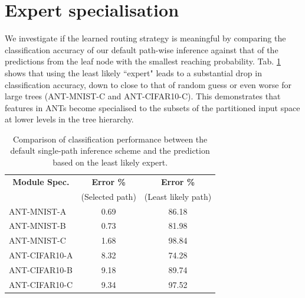 \section{Expert specialisation}\label{sec:supp_expert_specialisation}
\vspace{-2mm}
We investigate if the learned routing strategy is meaningful by comparing the classification accuracy of our default path-wise inference against that of the predictions from the leaf node with the smallest reaching probability. Tab. \ref{tab:test_routers} shows that using the least likely ``expert" leads to a substantial drop in classification accuracy, down to close to that of random guess or even worse for large trees (ANT-MNIST-C and ANT-CIFAR10-C). This demonstrates that features in ANTs become specialised to the subsets of the partitioned input space at lower levels in the tree hierarchy. 

\begin{table}[h]
	\caption {Comparison of classification performance between the default single-path inference scheme and the prediction based on the least likely expert. \label{tab:test_routers}}
    \footnotesize
    \center
	\begin{tabular}{|l|c|c|}
		\hline
		\multicolumn{1}{|c}{\textbf{Module Spec.}} &  \multicolumn{1}{|c|}{\textbf{Error \%}} & \multicolumn{1}{c|}{\textbf{Error \%}}  \\
		&(Selected path) & (Least likely path)  \\
		\hline
		ANT-MNIST-A &0.69 & 86.18  \\
	    ANT-MNIST-B &0.73 & 81.98  \\
        ANT-MNIST-C &1.68 & 98.84  \\
		ANT-CIFAR10-A & 8.32 & 74.28  \\
        ANT-CIFAR10-B & 9.18 & 89.74  \\
        ANT-CIFAR10-C & 9.34 & 97.52  \\
		\hline
	\end{tabular}
\end{table}
\vspace{-4mm}
